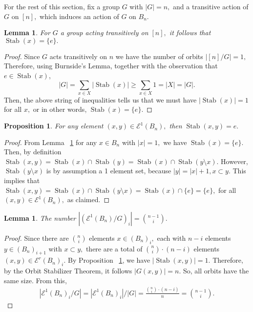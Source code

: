 \documentclass[10 pt]{amsart}
\theoremstyle{plain}
\newtheorem{prop}[thm]{Proposition}
\newtheorem{lem}[thm]{Lemma}
\theoremstyle{definition}
\theoremstyle{remark}
\numberwithin{equation}{section}
\def\Stab{\operatorname{Stab}}
\begin{document}
For the rest of this section, fix a group $G$ with $|G| = n,$ and a transitive action of $G$ on $[n],$ which induces an action of $G$ on $B_n.$

\begin{lem}
\label{lem:stabilizer_one}
For $G$ a group acting transitively on $[n],$ it follows that $\Stab(x) = \{e\}.$
\end{lem}
\begin{proof}
Since $G$ acts transitively on $n$ we have the number of orbits $|[n]/G| = 1,$ Therefore, using Burnside's Lemma, together with the observation that $e \in \Stab(x)$,
$$|G| = \sum_{x\in X}|\Stab(x)|\geq \sum_{x \in X} 1=|X|= |G|.$$
Then, the above string of inequalities tells us that we must have $|\Stab(x)| = 1$ for all $x,$ or in other words, $\Stab(x) = \{e\}.$
\end{proof}

\begin{prop}
\label{prop:stabilizer_edge}
For any element $(x , y) \in \mathcal E^1(B_n),$ then $\Stab(x, y) = e.$
\end{prop}
\begin{proof}
From Lemma ~\ref{lem:stabilizer_one} for any $x \in B_n$ with $|x| = 1,$ we have $\Stab(x) = \{e\}.$ Then, by definition $\Stab(x, y) = \Stab(x) \cap \Stab(y) = \Stab(x) \cap \Stab(y \setminus x).$ However, $\Stab(y \setminus x)$ is by assumption a 1 element set, because $|y| = |x| +1,x \subset y.$ This implies that $\Stab(x, y)=\Stab(x) \cap \Stab(y \setminus x) = \Stab(x) \cap \{e\} = \{e\},$ for all $(x, y) \in \mathcal E^1(B_n),$ as claimed.
\end{proof}

\begin{lem}
\label{lem:q_counts}
The number $|(\mathcal E^1(B_n)/G)_i| = \binom{n-1}{i}.$
\end{lem}
\begin{proof}
Since there are $\binom{n}{i}$ elements $x\in(B_n)_i,$ each with $n-i$ elements $y \in (B_n)_{i+1}$ with $x \subset y,$ there are a total of $\binom{n}{i}\cdot (n-i)$ elements $(x, y) \in \mathcal E^r(B_n)_i.$ By Proposition ~\ref{prop:stabilizer_edge}, we have $|\Stab(x, y)| = 1.$ Therefore, by the Orbit Stabilizer Theorem, it follows $|G(x, y)| = n.$ So, all orbits have the same size. From this,
\begin{align*}
|\mathcal E^1(B_n)_i/G| = |\mathcal E^1(B_n)_i|/|G| = \frac{\binom{n}{i}\cdot (n-i)}{n} = \binom {n-1}{i}.
\end{align*}
\end{proof}
\end{document}
